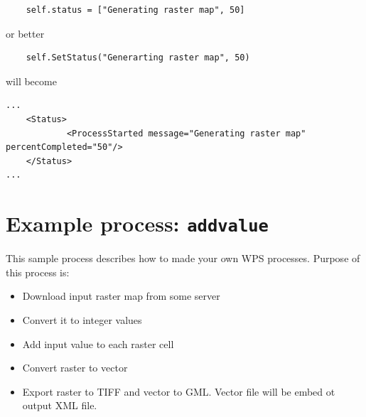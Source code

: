 \documentclass[a4paper,11pt]{article}
\begin{document}
\begin{verbatim}
    self.status = ["Generating raster map", 50]
\end{verbatim}
or better
\begin{verbatim}
    self.SetStatus("Generarting raster map", 50)
\end{verbatim}

will become

\begin{verbatim}
...
    <Status>
            <ProcessStarted message="Generating raster map" percentCompleted="50"/>
    </Status>
...
\end{verbatim}

\appendix

    \section{Example process: \texttt{addvalue}}
    This sample process describes how to made your own WPS processes. Purpose of this process is:
    \begin{itemize}
    \item  Download input raster map from some server
    \item  Convert it to integer values
    \item  Add input value to each raster cell
    \item  Convert raster to vector
    \item  Export raster to TIFF and vector to GML. Vector file will be embed ot output XML file.
    \end{itemize}
\end{document}
